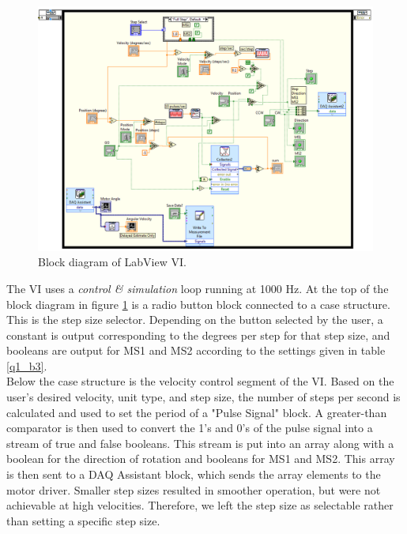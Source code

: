 \documentclass{article}
\theoremstyle{plain}
\theoremstyle{definition}
\theoremstyle{remark}
\begin{document}
\begin{figure}[h]
\begin{center}
\includegraphics[width = 18cm]{VIBlockDiagram.png}
\caption{Block diagram of LabView VI.}
\label{q2_2}
\end{center}
\end{figure}

The VI uses a \emph{control \& simulation} loop running at 1000 Hz. At the top of the block diagram in figure \ref{q2_2} is a radio button block connected to a case structure. This is the step size selector. Depending on the button selected by the user, a constant is output corresponding to the degrees per step for that step size, and booleans are output for MS1 and MS2 according to the settings given in table \ref{q1_b3}.\\

Below the case structure is the velocity control segment of the VI. Based on the user's desired velocity, unit type, and step size, the number of steps per second is calculated and used to set the period of a "Pulse Signal" block. A greater-than comparator is then used to convert the 1's and 0's of the pulse signal into a stream of true and false booleans. This stream is put into an array along with a boolean for the direction of rotation and booleans for MS1 and MS2. This array is then sent to a DAQ Assistant block, which sends the array elements to the motor driver. Smaller step sizes resulted in smoother operation, but were not achievable at high velocities. Therefore, we left the step size as selectable rather than setting a specific step size.\\
\end{document}
